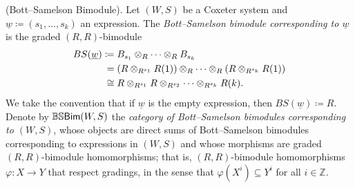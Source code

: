 \noindent\begin{definition}\textnormal{(Bott--Samelson Bimodule).} Let $(W, S)$ be a Coxeter system and $\underline{w} \coloneqq (s_1, \dots, s_k)$ an expression. The {\em Bott--Samelson bimodule corresponding to $\underline{w}$} is the graded $(R, R)$-bimodule
\begin{align*}
\begin{split}
BS(\underline{w}) &\coloneqq B_{s_1} \otimes_R \cdots \otimes_R B_{s_k}\\
&\hphantom{\coloneqq}\nhphantom{=}= (R \otimes_{R^{s_1}} R(1)) \otimes_R \cdots \otimes_R (R \otimes_{R^{s_k}} R(1))\\
&\hphantom{\coloneqq}\nhphantom{$\cong$}\cong R \otimes_{R^{s_1}} R \otimes_{R^{s_2}} \cdots \otimes_{R^{s_k}} R(k).
\end{split}
\end{align*}
\noindent We take the convention that if $\underline{w}$ is the empty expression, then $BS(\underline{w}) \coloneqq R$. Denote by $\mathbb{BS}\textnormal{\textsf{Bim}}(W, S)$ the {\em category of Bott--Samelson bimodules corresponding to $(W, S)$}, whose objects are direct sums of Bott--Samelson bimodules corresponding to expressions in $(W, S)$ and whose morphisms are graded $(R, R)$-bimodule homomorphisms; that is, $(R, R)$-bimodule homomorphisms $\varphi : X \to Y$ that respect gradings, in the sense that $\varphi(X^i) \subseteq Y^i$ for all $i \in \mathbb{Z}$.\\
\end{definition}

